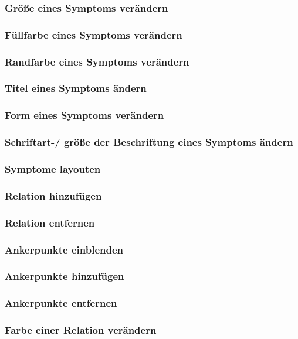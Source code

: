 \documentclass[enabledeprecatedfontcommands,fontsize=11pt,paper=a4,twoside]{scrartcl}
\begin{document}
		\subsubsection{Größe eines Symptoms verändern}
		\subsubsection{Füllfarbe eines Symptoms verändern}
		\subsubsection{Randfarbe eines Symptoms verändern}
		\subsubsection{Titel eines Symptoms ändern}
		\subsubsection{Form eines Symptoms verändern}
		\subsubsection{Schriftart-/ größe der Beschriftung eines Symptoms ändern}
		\subsubsection{Symptome layouten}
			
		\subsubsection{Relation hinzufügen}
		\subsubsection{Relation entfernen}
		\subsubsection{Ankerpunkte einblenden}
		\subsubsection{Ankerpunkte hinzufügen}
		\subsubsection{Ankerpunkte entfernen}
		\subsubsection{Farbe einer Relation verändern}
\end{document}
